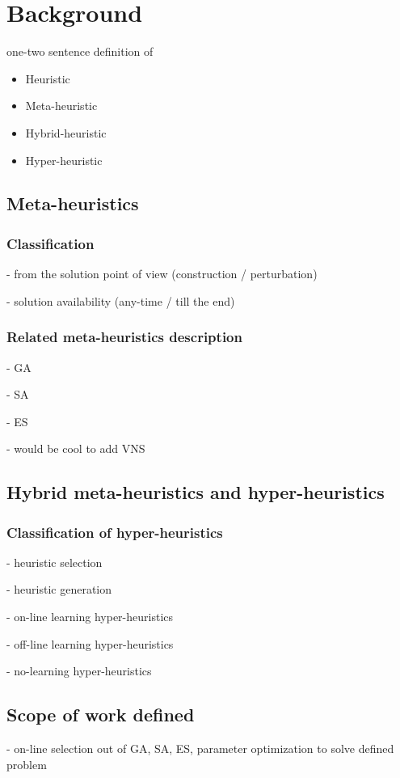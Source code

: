 \chapter{Background}
one-two sentence definition of 
\begin{itemize}
  \item Heuristic
  \item Meta-heuristic
  \item Hybrid-heuristic
  \item Hyper-heuristic
\end{itemize}

\section{Meta-heuristics}
\subsection{Classification}

- from the solution point of view (construction / perturbation)

- solution availability (any-time / till the end)
     
\subsection{Related meta-heuristics description}
- GA

- SA

- ES

- would be cool to add VNS
  
\section{Hybrid meta-heuristics and hyper-heuristics}
\subsection{Classification of hyper-heuristics}
- heuristic selection

- heuristic generation

- on-line learning hyper-heuristics

- off-line learning hyper-heuristics

- no-learning hyper-heuristics


\section{Scope of work defined}
- on-line selection out of GA, SA, ES, parameter optimization to solve defined problem

\cleardoublepage

